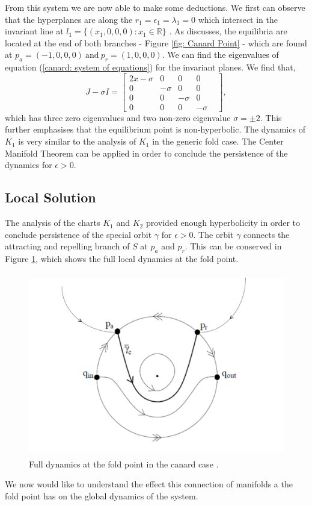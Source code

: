 From this system we are now able to make some deductions. We first can observe that the hyperplanes are along the $r_1=\epsilon_1=\lambda_1=0$ which intersect in the invariant line at $l_1=\{(x_1,0,0,0): x_1\in\mathbb{R}\}$ \citep{krupa2001}. As \citet{krupa2001} discusses, the equilibria are located at the end of both branches - Figure \ref{fig: Canard Point} - which are found at $p_a=(-1,0,0,0) \ \text{and} \ p_r=(1,0,0,0)$. We can find the eigenvalues of equation (\ref{canard: system of equations}) for the invariant planes. We find that, 
\begin{equation}
J-\sigma I= \begin{bmatrix}
2x-\sigma & 0 & 0 & 0  \\
0 & -\sigma & 0 & 0&\\
0 & 0 & -\sigma & 0 \\
0 & 0 & 0 & -\sigma
\end{bmatrix},
\end{equation}
which has three zero eigenvalues and two non-zero eigenvalue $\sigma=\pm 2$. This further emphasises that the equilibrium point is non-hyperbolic. 
The dynamics of $K_1$ is very similar to the analysis of $K_1$ in the generic fold case. The Center Manifold Theorem can be applied in order to conclude the persistence of the dynamics for $\epsilon >0$.

\subsection{Local Solution}
The analysis of the charts $K_1$ and $K_2$ provided enough hyperbolicity in order to conclude persistence of the special orbit $\gamma$ for $\epsilon >0$. The orbit $\gamma$ connects the attracting and repelling branch of $S$ at $p_a$ and $p_r$. This can be conserved in Figure \ref{canardsolloc}, which shows the full local dynamics at the fold point.
\begin{figure}[h!]\centering
	\includegraphics[height=8cm,width=12cm]{Images/pres-cancard}
	\caption{Full dynamics at the fold point in the canard case \citep{krupa2001}.}
	\label{canardsolloc}
\end{figure}
We now would like to understand the effect this connection of manifolds a the fold point has on the global dynamics of the system.

